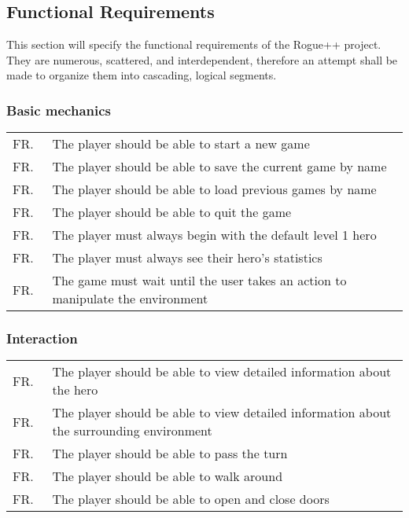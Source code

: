 \documentclass[12pt, titlepage]{article}
\newcounter{FRCounter}
\newcommand{\freq}[1]{
	\hfill\stepcounter{FRCounter}FR.\textbf{\theFRCounter}
	& #1
}
\begin{document}
	\subsection{Functional Requirements}

	This section will specify the functional requirements of the Rogue++ project. They are numerous, scattered, and interdependent, therefore an attempt shall be made to organize them into cascading, logical segments.

		\subsubsection{Basic mechanics}
			\begin{tabular}{p{0.1\linewidth}p{0.9\linewidth}}
				\freq{The player should be able to start a new game}\\
				\freq{The player should be able to save the current game by name}\\
				\freq{The player should be able to load previous games by name}\\
				\freq{The player should be able to quit the game}\\
				\freq{The player must always begin with the default level 1 hero}\\
				\freq{The player must always see their hero's statistics}\\
				\freq{The game must wait until the user takes an action to manipulate the environment}\\
			\end{tabular}

		\subsubsection{Interaction}
			\begin{tabular}{p{0.1\linewidth}p{0.9\linewidth}}
				\freq{The player should be able to view detailed information about the hero}\\
				\freq{The player should be able to view detailed information about the surrounding environment}\\
				\freq{The player should be able to pass the turn}\\
				\freq{The player should be able to walk around}\\
				\freq{The player should be able to open and close doors}\\
			\end{tabular}
\end{document}

